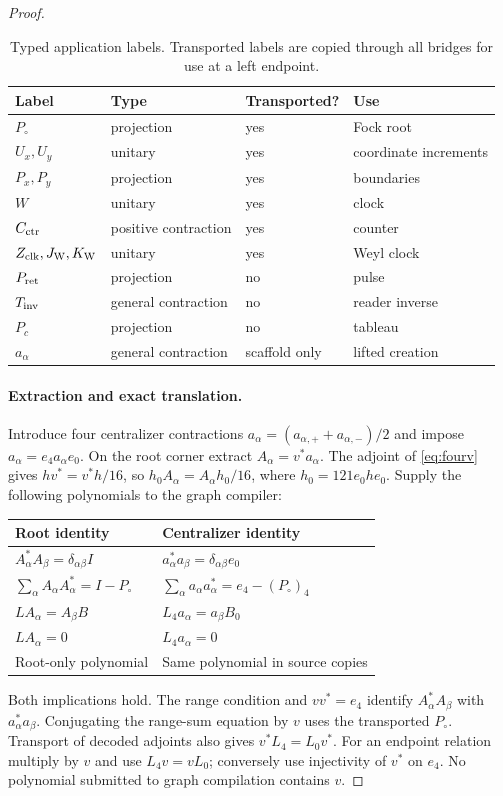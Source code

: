 \begin{proof}
\begin{table}[ht]
\centering\small
\begin{tabular}{@{}llll@{}}
\toprule Label & Type & Transported? & Use\\\midrule
$P_{\circ}$ & projection & yes & Fock root\\
$U_x,U_y$ & unitary & yes & coordinate increments\\
$P_x,P_y$ & projection & yes & boundaries\\
$W$ & unitary & yes & clock\\
$C_{\rm ctr}$ & positive contraction & yes & counter\\
$Z_{\rm clk},J_{\rm W},K_{\rm W}$ & unitary & yes & Weyl clock\\
$P_{\rm ret}$ & projection & no & pulse\\
$T_{\rm inv}$ & general contraction & no & reader inverse\\
$P_c$ & projection & no & tableau\\
$a_\alpha$ & general contraction & scaffold only & lifted creation\\
\bottomrule
\end{tabular}
\caption{Typed application labels. Transported labels are copied through
all bridges for use at a left endpoint.}\label{tab:labels}
\end{table}

\paragraph{Extraction and exact translation.}
Introduce four centralizer contractions $a_\alpha=(a_{\alpha,+}+a_{\alpha,-})/2$ and impose $a_\alpha=e_4a_\alpha e_0$. On the root corner extract $A_\alpha=v^*a_\alpha$. The adjoint of \eqref{eq:fourv} gives $hv^*=v^*h/16$, so $h_0A_\alpha=A_\alpha h_0/16$, where $h_0=121e_0he_0$. Supply the following polynomials to the graph compiler:
\begin{center}\small
\begin{tabular}{@{}ll@{}}
\toprule
Root identity & Centralizer identity\\
\midrule
$A_\alpha^*A_\beta=\delta_{\alpha\beta}I$ & $a_\alpha^*a_\beta=\delta_{\alpha\beta}e_0$\\
$\sum_\alpha A_\alpha A_\alpha^*=I-P_{\circ}$ & $\sum_\alpha a_\alpha a_\alpha^*=e_4-(P_{\circ})_4$\\
$LA_\alpha=A_\beta B$ & $L_4a_\alpha=a_\beta B_0$\\
$LA_\alpha=0$ & $L_4a_\alpha=0$\\
Root-only polynomial & Same polynomial in source copies\\
\bottomrule
\end{tabular}
\end{center}
Both implications hold. The range condition and $vv^*=e_4$ identify $A_\alpha^*A_\beta$ with $a_\alpha^*a_\beta$. Conjugating the range-sum equation by $v$ uses the transported $P_{\circ}$. Transport of decoded adjoints also gives $v^*L_4=L_0v^*$. For an endpoint relation multiply by $v$ and use $L_4v=vL_0$; conversely use injectivity of $v^*$ on $e_4$. No polynomial submitted to graph compilation contains $v$.


\end{proof}

